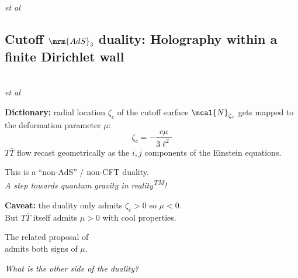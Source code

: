 \documentclass[10pt]{article}
\newcommand{\citations}[1]{{\footnotesize#1\par}}
\newcommand{\reality}{reality\textsuperscript{TM}}
\newcommand{\TTbar}{\texorpdfstring{\ensuremath{T\bar{T}}}{TTbar}\xspace}
\begin{document}
\begin{multicols}{3}
\begin{itemize}
\citations{
\textcite{Zamolodchikov:2004ce}\\
\textcite{Dubovsky:2012wk}\\
\textcite{Dubovsky:2013ira}\\
\textcite{Smirnov:2016lqw}\\
\textcite{Cavaglia:2016oda} \textit{et al}%
}

\vspace{-.5\baselineskip}

\end{itemize}

\subsection*{Cutoff $\mrm{AdS}_3$ duality:\texstringonly{\\} Holography within a finite Dirichlet wall}

\citations{
\textcite{McGough:2016lol}\\
\textcite{Kraus:2018xrn} \textit{et al}
}

\textbf{Dictionary:} radial location $\zeta_c$ of the cutoff surface $\mcal{N}_{\zeta_c}$ gets mapped to the deformation parameter $\mu$:
\begin{equation}
	\zeta_c = - \frac{c \mu}{3\ell^2}
	\label{dictionary}
\end{equation}
\TTbar flow recast geometrically as the $i,j$ components of the Einstein equations. 

This is a ``non-AdS'' / non-CFT duality.\\
\textit{A step towards quantum gravity in \reality!}

\textbf{Caveat:} the duality only admits $\zeta_c > 0$ so $\mu < 0$.\\
But \TTbar itself admits $\mu > 0$ with cool properties.

\citations{The related proposal of \textcite{Guica:2019nzm}\\
admits both signs of $\mu$.}

\textit{What is the other side of the duality?}

\columnbreak


\end{multicols}
\end{document}
